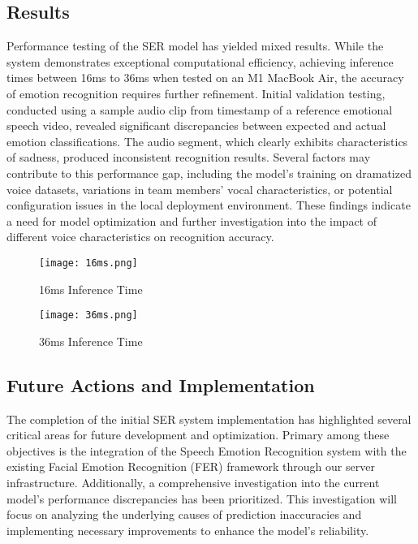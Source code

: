 \subsection{Results}
Performance testing of the SER model has yielded mixed results. While the system demonstrates exceptional computational efficiency, achieving inference times between 16ms to 36ms when tested on an M1 MacBook Air, the accuracy of emotion recognition requires further refinement. Initial validation testing, conducted using a sample audio clip from timestamp of a reference emotional speech video, revealed significant discrepancies between expected and actual emotion classifications. The audio segment, which clearly exhibits characteristics of sadness, produced inconsistent recognition results. Several factors may contribute to this performance gap, including the model's training on dramatized voice datasets, variations in team members' vocal characteristics, or potential configuration issues in the local deployment environment. These findings indicate a need for model optimization and further investigation into the impact of different voice characteristics on recognition accuracy.

\begin{figure}[ht]
    \centering
    \captionsetup{justification=centering}
    \texttt{[image: 16ms.png]}
    \caption{16ms Inference Time}
    \label{fig:16ms}
\end{figure}

\begin{figure}[ht]
    \centering
    \captionsetup{justification=centering}
    \texttt{[image: 36ms.png]}
    \caption{36ms Inference Time}
    \label{fig:36ms}
\end{figure}

\subsection{Future Actions and Implementation}
The completion of the initial SER system implementation has highlighted several critical areas for future development and optimization. Primary among these objectives is the integration of the Speech Emotion Recognition system with the existing Facial Emotion Recognition (FER) framework through our server infrastructure. Additionally, a comprehensive investigation into the current model's performance discrepancies has been prioritized. This investigation will focus on analyzing the underlying causes of prediction inaccuracies and implementing necessary improvements to enhance the model's reliability. 
